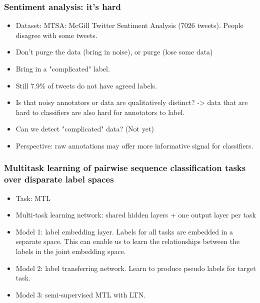 \subsubsection{Sentiment analysis: it's hard\cite{Kenyon-Dean2018Sentiment}}
\begin{itemize}
	\item Dataset: MTSA: McGill Twitter Sentiment Analysis (7026 tweets). People disagree with some tweets.
	\item Don't purge the data (bring in noise), or purge (lose some data)
	\item Bring in a "complicated" label. 
	\item Still 7.9\% of tweets do not have agreed labels.
	\item Is that noisy annotators or data are qualitatively distinct?  -> data that are hard to classifiers are also hard for annotators to label.
	\item Can we detect "complicated" data? (Not yet)
	\item Perspective: raw annotations may offer more informative signal for classifiers. 
\end{itemize}


\subsubsection{Multitask learning of pairwise sequence classification tasks over disparate label spaces\cite{Augenstein2018Multi-Task}}
\begin{itemize}
	\item Task: MTL
	\item Multi-task learning network: shared hidden layers + one output layer per task
	\item Model 1: label embedding layer. Labels for all tasks are embedded in a separate space. This can enable us to learn the relationships between the labels in the joint embedding space.
	\item Model 2: label transferring network. Learn to produce pseudo labels for target task.
	\item Model 3: semi-supervised MTL with LTN.
\end{itemize}


